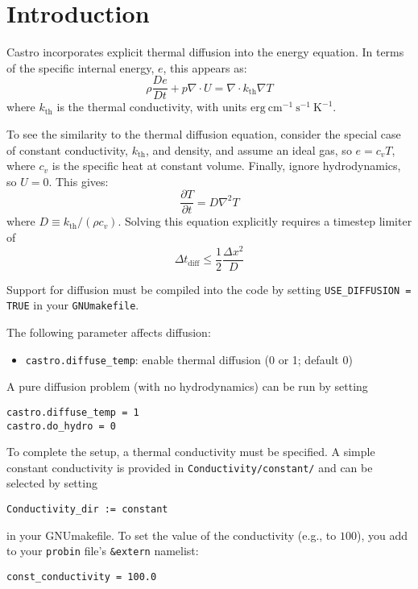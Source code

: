 \section{Introduction}

Castro incorporates explicit thermal diffusion into the energy equation.  
In terms of the specific internal energy, $e$, this appears as:
\begin{equation}
\rho \frac{De}{Dt} + p \nabla \cdot U = \nabla \cdot k_\mathrm{th} \nabla T
\end{equation}
where $k_\mathrm{th}$ is the thermal conductivity, with units
$\mathrm{erg~cm^{-1}~s^{-1}~K^{-1}}$.

To see the similarity to the thermal diffusion equation, consider the special
case of constant conductivity, $k_\mathrm{th}$, and density, and assume an
ideal gas, so $e = c_v T$, where $c_v$ is the specific heat at constant volume.
Finally, ignore hydrodynamics, so $U = 0$.  This gives:
\begin{equation}
\frac{\partial T}{\partial t} = D \nabla^2 T
\end{equation}
where $D \equiv k_\mathrm{th}/(\rho c_v)$.  Solving this equation explicitly requires
a timestep limiter of
\begin{equation}
\Delta t_\mathrm{diff} \le \frac{1}{2} \frac{\Delta x^2}{D}
\end{equation}

Support for diffusion must be compiled into the code by setting
{\tt USE\_DIFFUSION = TRUE} in your {\tt GNUmakefile}.


The following parameter affects diffusion:
\begin{itemize}
\item {\tt castro.diffuse\_temp}:  enable thermal diffusion (0 or 1; default 0)
\end{itemize}

A pure diffusion problem (with no hydrodynamics) can be run by setting
\begin{verbatim}
castro.diffuse_temp = 1
castro.do_hydro = 0
\end{verbatim}

To complete the setup, a thermal conductivity must be specified.
A simple constant conductivity is provided in {\tt Conductivity/constant/}
and can be selected by setting
\begin{verbatim}
Conductivity_dir := constant
\end{verbatim}
in your GNUmakefile.  To set the value of the conductivity (e.g., to
$100$), you add to your {\tt probin} file's {\tt \&extern} namelist:
\begin{verbatim}
const_conductivity = 100.0
\end{verbatim}



